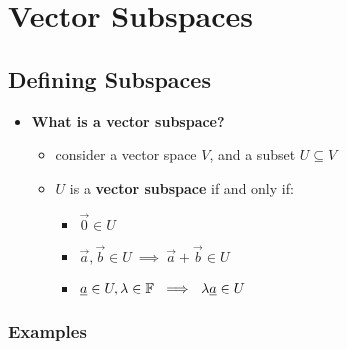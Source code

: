 \documentclass{exam}
\begin{document}
\section{Vector Subspaces}

\subsection{Defining Subspaces}

\begin{itemize}
    \item \textbf{What is a vector subspace?}
    \begin{itemize}
        \item consider a vector space $V$, and a subset $U \subseteq V$
        \item $U$ is a \textbf{vector subspace} if and only if:
        \begin{itemize}
            \item $\vec{0} \in U$
            \item $\vec{a}, \vec{b} \in U \ \implies \ \vec{a} + \vec{b} \in U$
            \item $\vec{a} \in U, \lambda \in \F \ \implies \ \lambda \vec{a} \in U$
        \end{itemize}
    \end{itemize}
\end{itemize}

\subsubsection{Examples}
\end{document}
